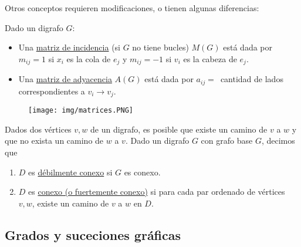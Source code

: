 Otros conceptos requieren modificaciones, o tienen algunas diferencias:

\begin{defn}
    Dado un digrafo $G$:
    
    \begin{itemize}
        \item Una \ul{matriz de incidencia} (si $G$ no tiene bucles) $M(G)$ está dada por $m_{ij} = 1$ si $x_i$ es la cola de $e_j$ y $m_{ij} = -1$ si $v_i$ es la cabeza de $e_j$.
        \item Una \ul{matriz de adyacencia} $A(G)$ está dada por $a_{ij} =$~cantidad de lados correspondientes a $v_i \rightarrow v_j$.
    \end{itemize}
    
    \begin{figure}
        \centering
        \texttt{[image: img/matrices.PNG]}
        \caption{}
        \label{fig:matrices}
    \end{figure}
\end{defn}

\begin{defn}
    Dados dos vértices $v,w$ de un digrafo, es posible que existe un camino de $v$ a $w$ y que no exista un camino de $w$ a $v$. Dado un digrafo $G$ con grafo base $G$, decimos que
    
    \begin{enumerate}
        \item $D$ es \ul{débilmente conexo} si $G$ es conexo.
        \item $D$ es \ul{conexo (o fuertemente conexo)} si para cada par ordenado de vértices $v,w$, existe un camino de $v$ a $w$ en $D$.
    \end{enumerate}
\end{defn}

\subsection{Grados y suceciones gráficas}

